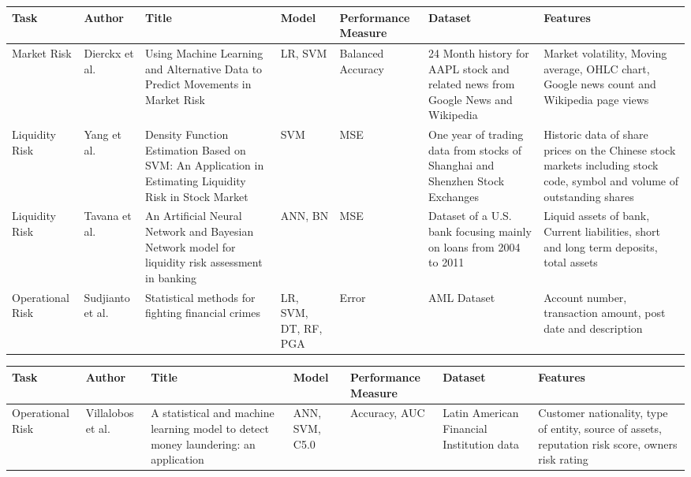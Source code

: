 \documentclass[a4paper, 12pt]{article}
\begin{document}
\begin{table}[H]
\bgroup
\def\arraystretch{1.5}
\begin{tabular}{ | p{1.9cm} | p{1.6cm}| p{2.1cm} | p{1.4cm}| p{2.3cm}| p{1.9cm}| p{2.2cm}| }
\hline
\textbf{Task} & \textbf{Author}  & \textbf{Title}  & \textbf{Model} & \textbf{Performance Measure}  & \textbf{Dataset}  & \textbf{Features} \\

\hline
Market Risk &
Dierckx et al. \cite{dierckx2020using} &
Using Machine Learning and Alternative Data to Predict Movements in Market Risk &
LR, SVM &
Balanced Accuracy &
24 Month history for AAPL stock and related news from Google News and Wikipedia &
Market volatility, Moving average, OHLC chart, Google news count and Wikipedia page views
\\
\hline

Liquidity Risk &
Yang et al. \cite{yang2009density} &
Density Function Estimation Based on SVM: An Application in Estimating Liquidity Risk in Stock Market &
SVM &
MSE &
One year of trading data from stocks  of Shanghai and Shenzhen Stock Exchanges &
Historic data of share prices on the Chinese stock markets including stock code, symbol and volume of outstanding shares
\\
\hline


Liquidity Risk &
Tavana et al. \cite{tavana2018artificial} &
An Artificial Neural Network and Bayesian Network model for liquidity risk assessment in banking &
ANN, BN &
MSE &
Dataset of a U.S. bank focusing mainly on loans from 2004 to 2011 &
Liquid assets of bank, Current liabilities, short and long term deposits, total assets 
\\
\hline

Operational Risk &
Sudjianto et al. \cite{sudjianto2010statistical} &
Statistical methods for fighting financial crimes &
LR, SVM, DT, RF, PGA &
Error &
AML Dataset &
Account number, transaction amount, post date and description
\\
\hline

\end{tabular}
\egroup
\end{table}


\newpage
\begin{table}[H]
\bgroup
\def\arraystretch{1.5}
\begin{tabular}{ | p{1.9cm} | p{1.6cm}| p{2.1cm} | p{1.4cm}| p{2.3cm}| p{1.9cm}| p{2.2cm}| }
\hline
\textbf{Task} & \textbf{Author}  & \textbf{Title}  & \textbf{Model} & \textbf{Performance Measure}  & \textbf{Dataset}  & \textbf{Features} \\

\hline

Operational Risk &
Villalobos et al. \cite{villalobos2017statistical} &
A statistical and machine learning model to detect money laundering: an application &
ANN, SVM, C5.0 &
Accuracy, AUC &
Latin American Financial Institution data &
Customer nationality, type of entity, source of assets, reputation risk score, owners risk rating 
\\
\hline


\end{tabular}
\egroup
\end{table}
\end{document}
